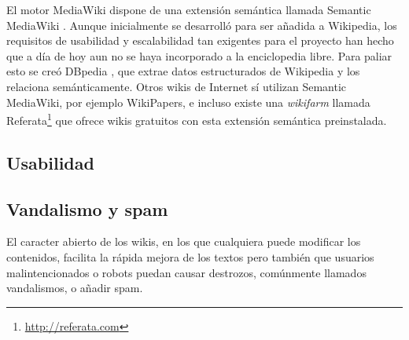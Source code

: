 \documentclass[11pt,onecolumn]{article}
\begin{document}
El motor MediaWiki dispone de una extensión semántica llamada Semantic MediaWiki \citep{krotzsch2006}. Aunque inicialmente se desarrolló para ser añadida a Wikipedia, los requisitos de usabilidad y escalabilidad tan exigentes para el proyecto han hecho que a día de hoy aun no se haya incorporado a la enciclopedia libre. Para paliar esto se creó DBpedia \citep{auer2007}, que extrae datos estructurados de Wikipedia y los relaciona semánticamente. Otros wikis de Internet sí utilizan Semantic MediaWiki, por ejemplo WikiPapers, e incluso existe una \emph{wikifarm} llamada Referata\footnote{\href{http://referata.com}{http://referata.com}} que ofrece wikis gratuitos con esta extensión semántica preinstalada. 


\subsection{Usabilidad}



%

\subsection{Vandalismo y spam}


El caracter abierto de los wikis, en los que cualquiera puede modificar los contenidos, facilita la rápida mejora de los textos pero también que usuarios malintencionados o robots puedan causar destrozos, comúnmente llamados vandalismos, o añadir spam.
\end{document}
